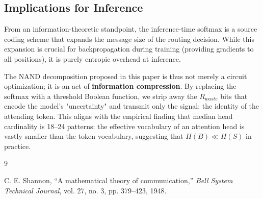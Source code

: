 \subsection{Implications for Inference}













From an information-theoretic standpoint, the inference-time softmax is a source coding scheme that expands the message size of the routing decision. While this expansion is crucial for backpropagation during training (providing gradients to all positions), it is purely entropic overhead at inference.













The NAND decomposition proposed in this paper is thus not merely a circuit optimization; it is an act of \textbf{information compression}. By replacing the softmax with a threshold Boolean function, we strip away the $R_{waste}$ bits that encode the model's "uncertainty" and transmit only the signal: the identity of the attending token. This aligns with the empirical finding that median head cardinality is 18–24 patterns: the effective vocabulary of an attention head is vastly smaller than the token vocabulary, suggesting that $H(B) \ll H(S)$ in practice.













\begin{thebibliography}{9}












C. E. Shannon, ``A mathematical theory of communication,'' \textit{Bell System Technical Journal}, vol. 27, no. 3, pp. 379--423, 1948.






\end{thebibliography}













